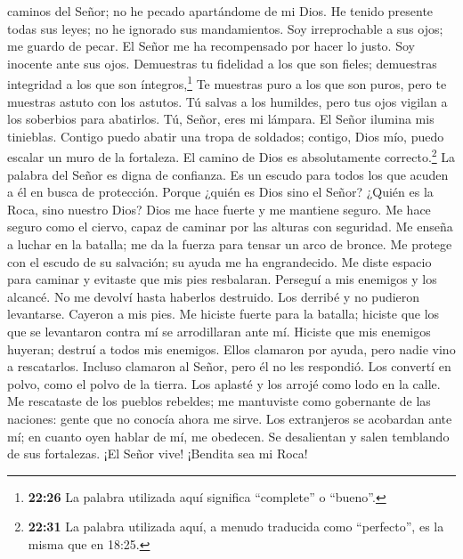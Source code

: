 caminos del Señor; no he pecado apartándome de mi Dios. 
He tenido presente todas sus leyes; no he ignorado sus mandamientos.
 Soy irreprochable a sus ojos; me guardo de pecar.
 El Señor me ha recompensado por hacer lo justo. Soy
inocente ante sus ojos.  Demuestras tu fidelidad a los
que son fieles; demuestras integridad a los que son íntegros,\footnote{\textbf{22:26}
  La palabra utilizada aquí significa ``complete'' o ``bueno''.}
 Te muestras puro a los que son puros, pero te muestras
astuto con los astutos.  Tú salvas a los humildes, pero
tus ojos vigilan a los soberbios para abatirlos.  Tú,
Señor, eres mi lámpara. El Señor ilumina mis tinieblas. 
Contigo puedo abatir una tropa de soldados; contigo, Dios mío, puedo
escalar un muro de la fortaleza.  El camino de Dios es
absolutamente correcto.\footnote{\textbf{22:31} La palabra utilizada
  aquí, a menudo traducida como ``perfecto'', es la misma que en 18:25.}
La palabra del Señor es digna de confianza. Es un escudo para todos los
que acuden a él en busca de protección.  Porque ¿quién es
Dios sino el Señor? ¿Quién es la Roca, sino nuestro Dios?
 Dios me hace fuerte y me mantiene seguro.
 Me hace seguro como el ciervo, capaz de caminar por las
alturas con seguridad.  Me enseña a luchar en la batalla;
me da la fuerza para tensar un arco de bronce.  Me
protege con el escudo de su salvación; su ayuda me ha engrandecido.
 Me diste espacio para caminar y evitaste que mis pies
resbalaran.  Perseguí a mis enemigos y los alcancé. No me
devolví hasta haberlos destruido.  Los derribé y no
pudieron levantarse. Cayeron a mis pies.  Me hiciste
fuerte para la batalla; hiciste que los que se levantaron contra mí se
arrodillaran ante mí.  Hiciste que mis enemigos huyeran;
destruí a todos mis enemigos.  Ellos clamaron por ayuda,
pero nadie vino a rescatarlos. Incluso clamaron al Señor, pero él no les
respondió.  Los convertí en polvo, como el polvo de la
tierra. Los aplasté y los arrojé como lodo en la calle. 
Me rescataste de los pueblos rebeldes; me mantuviste como gobernante de
las naciones: gente que no conocía ahora me sirve.  Los
extranjeros se acobardan ante mí; en cuanto oyen hablar de mí, me
obedecen.  Se desalientan y salen temblando de sus
fortalezas.  ¡El Señor vive! ¡Bendita sea mi Roca!
